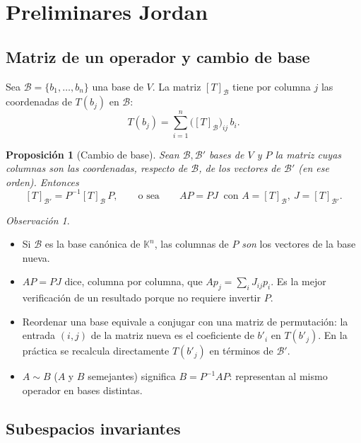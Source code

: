 \documentclass{article}
\newcommand{\K}{\mathbb{K}}
\theoremstyle{plain}
\newtheorem{proposicion}[teorema]{Proposición}
\theoremstyle{definition}
\theoremstyle{remark}
\newtheorem*{observacion}{Observación}
\begin{document}
\newpage

\section{Preliminares Jordan}

\subsection{Matriz de un operador y cambio de base}

Sea \(\mathcal B=\{b_1,\dots,b_n\}\) una base de \(V\). La matriz \([T]_{\mathcal B}\) tiene por columna \(j\) las coordenadas de \(T(b_j)\) en \(\mathcal B\):
\[
    T(b_j)=\sum_{i=1}^n\big([T]_{\mathcal B}\big)_{ij}\,b_i .
\]

\begin{proposicion}[Cambio de base]\label{prop:cambio}
    Sean \(\mathcal B,\mathcal B'\) bases de \(V\) y \(P\) la matriz cuyas columnas son las coordenadas, respecto de \(\mathcal B\), de los vectores de \(\mathcal B'\) (en ese orden). Entonces
    \[
        [T]_{\mathcal B'}=P^{-1}[T]_{\mathcal B}\,P,\qquad\text{o sea}\qquad AP=PJ\ \text{ con } A=[T]_{\mathcal B},\ J=[T]_{\mathcal B'}.
    \]
\end{proposicion}

\begin{observacion}
    \begin{itemize}
        \item Si \(\mathcal B\) es la base canónica de \(\K^n\), las columnas de \(P\) \emph{son} los vectores de la base nueva.
        \item \(AP=PJ\) dice, columna por columna, que \(Ap_j=\sum_iJ_{ij}p_i\). Es la mejor verificación de un resultado porque no requiere invertir \(P\).
        \item Reordenar una base equivale a conjugar con una matriz de permutación: la entrada \((i,j)\) de la matriz nueva es el coeficiente de \(b'_i\) en \(T(b'_j)\). En la práctica se recalcula directamente \(T(b'_j)\) en términos de \(\mathcal B'\).
        \item \(A\sim B\) (\(A\) y \(B\) semejantes) significa \(B=P^{-1}AP\): representan al mismo operador en bases distintas.
    \end{itemize}
\end{observacion}

\subsection{Subespacios invariantes}
\end{document}
